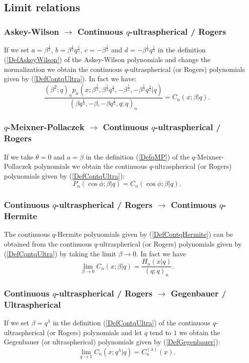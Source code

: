 \documentclass[envcountchap,graybox]{svmono}
\newcounter{rom}
\begin{document}
\subsection*{Limit relations}

\subsubsection*{Askey-Wilson $\rightarrow$ Continuous $q$-ultraspherical / Rogers}
If we set $a=\beta^{\frac{1}{2}}$, $b=\beta^{\frac{1}{2}}q^{\frac{1}{2}}$,
$c=-\beta^{\frac{1}{2}}$ and $d=-\beta^{\frac{1}{2}}q^{\frac{1}{2}}$ in the definition
(\ref{DefAskeyWilson}) of the Askey-Wilson polynomials and change the
normalization we obtain the continuous $q$-ultraspherical (or Rogers)
polynomials given by (\ref{DefContqUltra}). In fact we have:
$$\frac{(\beta^2;q)_np_n(x;\beta^{\frac{1}{2}},\beta^{\frac{1}{2}}q^{\frac{1}{2}},
-\beta^{\frac{1}{2}},-\beta^{\frac{1}{2}}q^{\frac{1}{2}}|q)}
{(\beta q^{\frac{1}{2}},-\beta,-\beta q^{\frac{1}{2}},q;q)_n}=C_n(x;\beta|q).$$

\subsubsection*{$q$-Meixner-Pollaczek $\rightarrow$ Continuous $q$-ultraspherical /
Rogers}
If we take $\theta=0$ and $a=\beta$ in the definition (\ref{DefqMP}) of the
$q$-Meixner-Pollaczek polynomials we obtain the continuous
$q$-ultraspherical (or Rogers) polynomials given by (\ref{DefContqUltra}):
$$P_n(\cos\phi;\beta|q)=C_n(\cos\phi;\beta|q).$$

\subsubsection*{Continuous $q$-ultraspherical / Rogers $\rightarrow$ Continuous $q$-Hermite}
The continuous $q$-Hermite polynomials given by (\ref{DefContqHermite})
can be obtained from the continuous $q$-ultraspherical (or Rogers)
polynomials given by (\ref{DefContqUltra}) by taking the limit
$\beta\rightarrow 0$. In fact we have
\begin{equation}
\lim_{\beta\rightarrow 0}C_n(x;\beta|q)=\frac{H_n(x|q)}{(q;q)_n}.
\end{equation}

\subsubsection*{Continuous $q$-ultraspherical / Rogers $\rightarrow$ Gegenbauer /
Ultra\-spherical}
If we set $\beta=q^{\lambda}$ in the definition (\ref{DefContqUltra}) of the
continuous $q$-ultraspherical (or Rogers) polynomials and let $q$ tend to $1$ we obtain
the Gegenbauer (or ultraspherical) polynomials given by (\ref{DefGegenbauer}):
\begin{equation}
\lim_{q\rightarrow 1}C_n(x;q^{\lambda}|q)=C_n^{(\lambda)}(x).
\end{equation}
\end{document}
